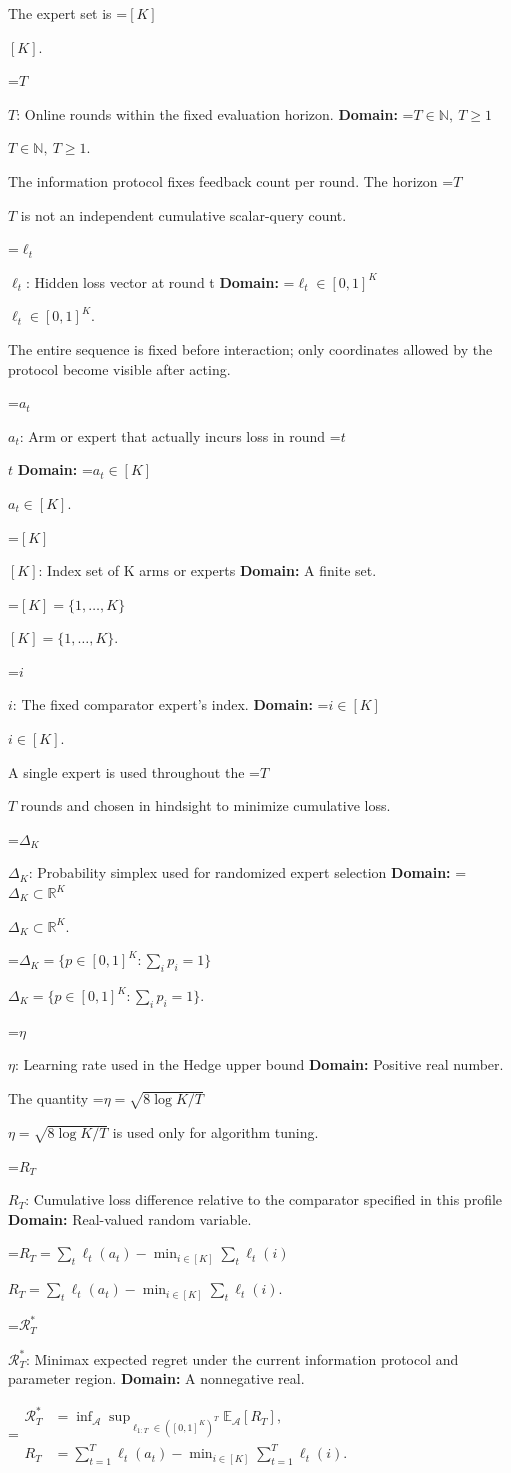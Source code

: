 \documentclass[10pt,a4paper]{article}
\newcommand{\AtlasMath}[1]{\par\begingroup\centering\setbox0=\hbox{$\displaystyle #1$}\ifdim\wd0>1.4\linewidth\typeout{ATLAS WIDE FORMULA: \the\wd0}\fi\ifdim\wd0>\linewidth\resizebox{\linewidth}{!}{\box0}\else\box0\fi\par\endgroup}
\newcommand{\AtlasInlineMath}[1]{\begingroup\setbox0=\hbox{$#1$}\ifdim\wd0>.4\linewidth\endgroup\AtlasMath{#1}\else\endgroup$#1$\fi}
\begin{document}
The expert set is \AtlasInlineMath{[K]}.

\AtlasInlineMath{T}: Online rounds within the fixed evaluation horizon. \textbf{Domain:} \AtlasInlineMath{T\in\mathbb N,\ T\ge1}.

The information protocol fixes feedback count per round. The horizon \AtlasInlineMath{T} is not an independent cumulative scalar-query count.

\AtlasInlineMath{\ell_t}: Hidden loss vector at round t \textbf{Domain:} \AtlasInlineMath{\ell_t\in[0,1]^K}.

The entire sequence is fixed before interaction; only coordinates allowed by the protocol become visible after acting.

\AtlasInlineMath{a_t}: Arm or expert that actually incurs loss in round \AtlasInlineMath{t} \textbf{Domain:} \AtlasInlineMath{a_t\in[K]}.

\AtlasInlineMath{[K]}: Index set of K arms or experts \textbf{Domain:} A finite set.

\AtlasInlineMath{[K]=\{1,\ldots,K\}}.

\AtlasInlineMath{i}: The fixed comparator expert’s index. \textbf{Domain:} \AtlasInlineMath{i\in[K]}.

A single expert is used throughout the \AtlasInlineMath{T} rounds and chosen in hindsight to minimize cumulative loss.

\AtlasInlineMath{\Delta_K}: Probability simplex used for randomized expert selection \textbf{Domain:} \AtlasInlineMath{\Delta_K\subset\mathbb R^K}.

\AtlasInlineMath{\Delta_K=\{p\in[0,1]^K:\sum_i p_i=1\}}.

\AtlasInlineMath{\eta}: Learning rate used in the Hedge upper bound \textbf{Domain:} Positive real number.

The quantity \AtlasInlineMath{\eta=\sqrt{8\log K/T}} is used only for algorithm tuning.

\AtlasInlineMath{R_T}: Cumulative loss difference relative to the comparator specified in this profile \textbf{Domain:} Real-valued random variable.

\AtlasInlineMath{R_T=\sum_t\ell_t(a_t)-\min_{i\in[K]}\sum_t\ell_t(i)}.

\AtlasInlineMath{\mathcal R_T^*}: Minimax expected regret under the current information protocol and parameter region. \textbf{Domain:} A nonnegative real.


\AtlasMath{\begin{aligned}\mathcal R_T^*&=\inf_{\mathcal A}\sup_{\ell_{1:T}\in([0,1]^K)^T}\mathbb E_{\mathcal A}[R_T],\\ R_T&=\sum_{t=1}^T\ell_t(a_t)-\min_{i\in[K]}\sum_{t=1}^T\ell_t(i).\end{aligned}}
\end{document}
